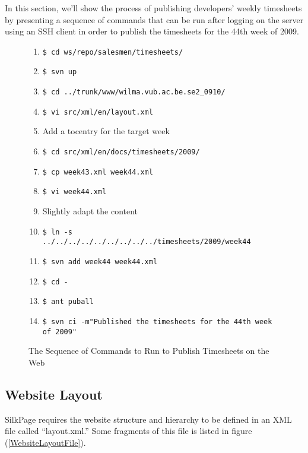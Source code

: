 In this section, we'll show the process of publishing developers' weekly
timesheets by presenting a sequence of commands that can be run after 
logging on the server using an SSH client in order to publish the timesheets
for the 44th week of 2009.

\begin{figure}[hb]
\caption{The Sequence of Commands to Run to Publish Timesheets
on the Web}
\label{WebsitePublishingTimesheetsCommands}
\begin{enumerate}
\item \verb*#$ cd ws/repo/salesmen/timesheets/#
\item \verb*#$ svn up#
\item \verb*#$ cd ../trunk/www/wilma.vub.ac.be.se2_0910/#
\item \verb*#$ vi src/xml/en/layout.xml#
\item Add a tocentry for the target week
\item \verb*#$ cd src/xml/en/docs/timesheets/2009/#
\item \verb*#$ cp week43.xml week44.xml#
\item \verb*#$ vi week44.xml #
\item Slightly adapt the content
\item \verb*#$ ln -s ../../../../../../../../../timesheets/2009/week44#
\item \verb*#$ svn add week44 week44.xml#
\item \verb*#$ cd -#
\item \verb*#$ ant puball#
\item \verb*#$ svn ci -m"Published the timesheets for the 44th week of 2009"#
\end{enumerate}
\end{figure}

\subsection{Website Layout}\label{WebsiteLayout}
SilkPage requires the website structure and hierarchy to be defined in an
XML file called ``layout.xml.'' Some fragments of this file is listed in
figure (\ref{WebsiteLayoutFile}).

